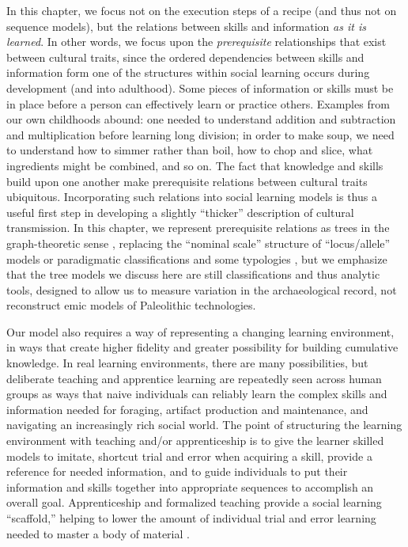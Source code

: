 \documentclass[graybox,natbib]{svmult}
\begin{document}
In this chapter, we focus not on the execution steps of a recipe (and
thus not on sequence models), but the relations between skills and
information \emph{as it is learned}. In other words, we focus upon the
\emph{prerequisite} relationships that exist between cultural traits,
since the ordered dependencies between skills and information form one
of the structures within social learning occurs during development (and
into adulthood). Some pieces of information or skills must be in place
before a person can effectively learn or practice others. Examples from
our own childhoods abound: one needed to understand addition and
subtraction and multiplication before learning long division; in order
to make soup, we need to understand how to simmer rather than boil, how
to chop and slice, what ingredients might be combined, and so on. The
fact that knowledge and skills build upon one another make prerequisite
relations between cultural traits ubiquitous. Incorporating such
relations into social learning models is thus a useful first step in
developing a slightly ``thicker'' description of cultural transmission.
In this chapter, we represent prerequisite relations as trees in the
graph-theoretic sense \citep{diestel2010graph}, replacing the ``nominal
scale'' structure of ``locus/allele'' models or paradigmatic
classifications and some typologies \citep{Dunnell1971}, but we
emphasize that the tree models we discuss here are still classifications
and thus analytic tools, designed to allow us to measure variation in
the archaeological record, not reconstruct emic models of Paleolithic
technologies.

Our model also requires a way of representing a changing learning
environment, in ways that create higher fidelity and greater possibility
for building cumulative knowledge. In real learning environments, there
are many possibilities, but deliberate teaching and apprentice learning
are repeatedly seen across human groups as ways that naive individuals
can reliably learn the complex skills and information needed for
foraging, artifact production and maintenance, and navigating an
increasingly rich social world. The point of structuring the learning
environment with teaching and/or apprenticeship is to give the learner
skilled models to imitate, shortcut trial and error when acquiring a
skill, provide a reference for needed information, and to guide
individuals to put their information and skills together into
appropriate sequences to accomplish an overall goal. Apprenticeship and
formalized teaching provide a social learning ``scaffold,'' helping to
lower the amount of individual trial and error learning needed to master
a body of material \citep{wimsatt2007reproducing, wimsatt2007re}.
\end{document}
